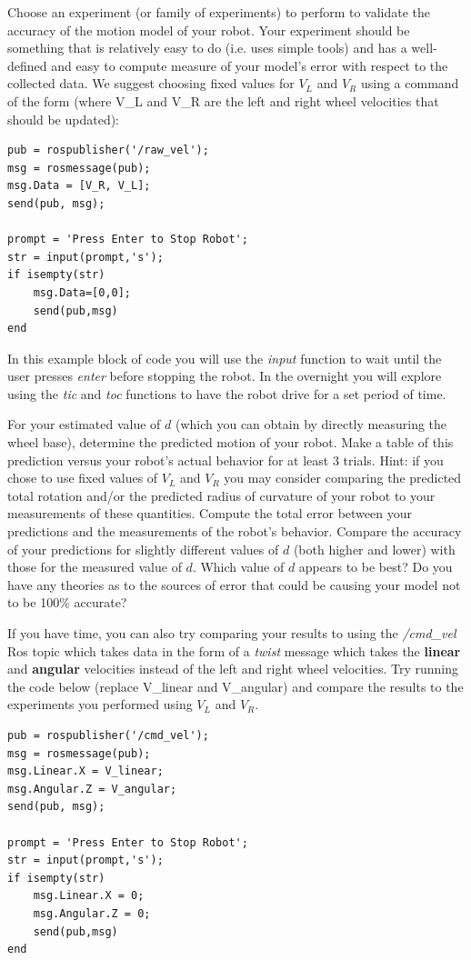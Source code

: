 \documentclass{tufte-handout}
\begin{document}
\begin{myboxi}
Choose an experiment (or family of experiments) to perform to validate the accuracy of the motion model of your robot.  Your experiment should be something that is relatively easy to do (i.e. uses simple tools) and has a well-defined and easy to compute measure of your model's error with respect to the collected data.  We suggest choosing fixed values for $V_L$ and $V_R$ using a command of the form (where V\_L and V\_R are the left and right wheel velocities that should be updated):

\begin{verbatim}
pub = rospublisher('/raw_vel');
msg = rosmessage(pub);
msg.Data = [V_R, V_L];
send(pub, msg);

prompt = 'Press Enter to Stop Robot';
str = input(prompt,'s');
if isempty(str)
    msg.Data=[0,0];
    send(pub,msg)
end
\end{verbatim}

In this example block of code you will use the \emph{input} function to wait until the user presses \emph{enter} before stopping the robot. In the overnight you will explore using the \emph{tic} and \emph{toc} functions to have the robot drive for a set period of time. 

For your estimated value of $d$ (which you can obtain by directly measuring the wheel base), determine the predicted motion of your robot.  Make a table of this prediction versus your robot's actual behavior for at least 3 trials.  Hint: if you chose to use fixed values of $V_L$ and $V_R$ you may consider comparing the predicted total rotation and/or the predicted radius of curvature of your robot to your measurements of these quantities.  Compute the total error between your predictions and the measurements of the robot's behavior.  Compare the accuracy of your predictions for slightly different values of $d$ (both higher and lower) with those for the measured value of $d$.  Which value of $d$ appears to be best?  Do you have any theories as to the sources of error that could be causing your model not to be 100\% accurate?


If you have time, you can also try comparing your results to using the \emph{/cmd\_vel} Ros topic which takes data in the form of a \emph{twist} message which takes the \textbf{linear} and \textbf{angular} velocities instead of the left and right wheel velocities. Try running the code below (replace V\_linear and V\_angular) and compare the results to the experiments you performed using $V_L$ and $V_R$.

\begin{verbatim}pub = rospublisher('/cmd_vel');
msg = rosmessage(pub);
msg.Linear.X = V_linear;
msg.Angular.Z = V_angular;
send(pub, msg);

prompt = 'Press Enter to Stop Robot';
str = input(prompt,'s');
if isempty(str)
    msg.Linear.X = 0;
    msg.Angular.Z = 0;
    send(pub,msg)
end
\end{verbatim}


\end{myboxi}
\end{document}
